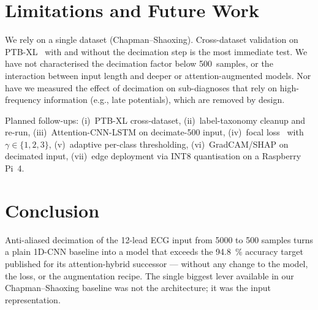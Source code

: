 \documentclass[conference]{IEEEtran}
\begin{document}
\section{Limitations and Future Work}
We rely on a single dataset (Chapman--Shaoxing). Cross-dataset validation on
PTB-XL~\cite{strodthoff2020} with and without the decimation step is the
most immediate test. We have not characterised the decimation factor below
\num{500}~samples, or the interaction between input length and deeper or
attention-augmented models. Nor have we measured the effect of decimation on
sub-diagnoses that rely on high-frequency information (e.g., late
potentials), which are removed by design.

Planned follow-ups: (i)~PTB-XL cross-dataset, (ii)~label-taxonomy cleanup
and re-run, (iii)~Attention-CNN-LSTM on decimate-500 input, (iv)~focal
loss~\cite{lin2017} with $\gamma\in\{1,2,3\}$, (v)~adaptive per-class
thresholding, (vi)~GradCAM/SHAP on decimated input, (vii)~edge deployment
via INT8 quantisation on a Raspberry Pi~4.

\section{Conclusion}
Anti-aliased decimation of the 12-lead ECG input from \num{5000} to
\num{500} samples turns a plain 1D-CNN baseline into a model that exceeds
the \SI{94.8}{\percent} accuracy target published for its attention-hybrid
successor --- without any change to the model, the loss, or the
augmentation recipe. The single biggest lever available in our Chapman--Shaoxing
baseline was not the architecture; it was the input representation.
\end{document}
